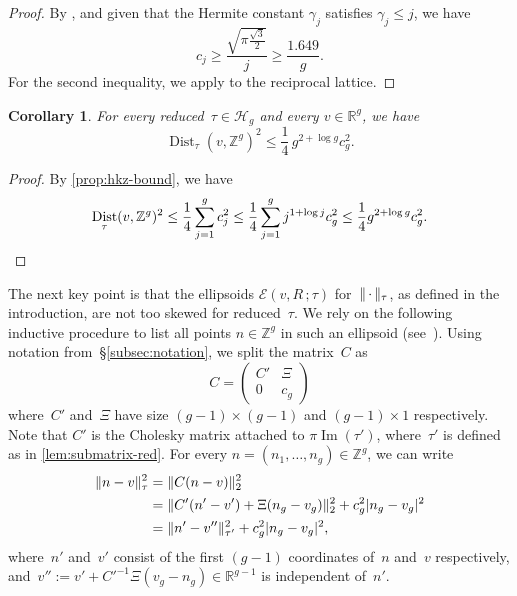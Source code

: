 \documentclass[12pt,oneside]{amsart}
\numberwithin{equation}{section}
\newtheorem{cor}[equation]{Corollary}
\theoremstyle{definition}
\newcommand{\Z}{\mathbb{Z}}
\newcommand{\R}{\mathbb{R}}
\newcommand{\Half}{\mathcal{H}}
\newcommand{\placeholder}{\,\cdot\,}
\newcommand{\eld}[3]{\ensuremath{\mathcal{E}(#1, #2\,; #3)}}
\DeclareMathOperator{\im}{Im}
\DeclareMathOperator{\Dist}{Dist}
\DeclarePairedDelimiter{\abs}{|}{|}
\DeclarePairedDelimiter{\norm}{\|}{\|}
\begin{document}
\begin{proof}
  By \cite[Prop.~4.1]{lagariasKorkinZolotarevBasesSuccessive1990}, and given
  that the Hermite constant $\gamma_j$ satisfies $\gamma_j\leq j$, we have
  \begin{displaymath}
    c_j \geq \frac{\sqrt{\pi\tfrac{\sqrt{3}}{2}}}{j} \geq \frac{1.649}{g}.
  \end{displaymath}
  For the second inequality, we apply
  \cite[Prop.~4.2]{lagariasKorkinZolotarevBasesSuccessive1990} to the
  reciprocal lattice.
\end{proof}

\begin{cor}
  \label{cor:hkz-dist}
  For every reduced~$\tau\in \Half_g$ and every $v\in \R^g$, we have
  \begin{displaymath}
    \Dist_\tau(v,\Z^g)^2 \leq \frac14\,g^{2+\log g} c_g^2.
  \end{displaymath}
\end{cor}

\begin{proof}
  By \cref{prop:hkz-bound}, we have
  \begin{displaymath}
    \Dist_\tau(v,\Z^g)^2 \leq \frac 14 \sum_{j=1}^g c_j^2 \leq \frac14 \sum_{j=1}^g j^{1+\log j} c_g^2 \leq \frac 14g^{2 + \log g} c_g^2. \qedhere
  \end{displaymath}
\end{proof}

The next key point is that the ellipsoids $\eld{v}{R}{\tau}$
for~$\norm{\placeholder}_\tau$, as defined in the introduction, are not too
skewed for reduced~$\tau$. We rely on the following inductive procedure to list
all points $n\in \Z^g$ in such an ellipsoid (see~\cite[Remark
p.\,9]{deconinckComputingRiemannTheta2004}). Using notation
from~§\ref{subsec:notation}, we split the matrix~$C$ as
\begin{equation}
  \label{eq:C-split}
  C =
  \begin{pmatrix}
    C' & \Xi \\ 0 & c_{g}
  \end{pmatrix}
\end{equation}
where~$C'$ and~$\Xi$ have size $(g-1)\times(g-1)$ and $(g-1)\times 1$
respectively. Note that $C'$ is the Cholesky matrix attached to
$\pi \im(\tau')$, where~$\tau'$ is defined as in \cref{lem:submatrix-red}. For
every $n = (n_1,\ldots,n_{g})\in \Z^g$, we can write
\begin{equation}
  \label{eq:pyth}
  \begin{aligned}
    \norm{n-v}_\tau^2 &= \norm{C(n-v)}_2^2\\
                      &= \norm{C' (n' - v') + \Xi (n_{g} - v_{g})}_2^2
                        + c_{g}^2\abs{n_{g}- v_{g}}^2\\
                      &=  \norm{n' - v''}_{\tau'}^2 + c_{g}^2\abs{n_{g}- v_{g}}^2,
  \end{aligned}
\end{equation}
where~$n'$ and~$v'$ consist of the first $(g-1)$ coordinates of~$n$ and~$v$
respectively, and~$v'' := v' + C'^{-1} \Xi (v_{g} - n_{g}) \in \R^{g-1}$ is
independent of~$n'$.
\end{document}
